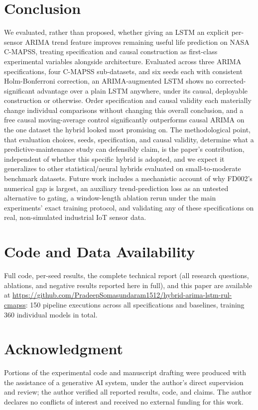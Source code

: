 \documentclass[conference]{IEEEtran}
\newif\ifblind
\begin{document}
\section{Conclusion}
We evaluated, rather than proposed, whether giving an LSTM an explicit per-sensor ARIMA trend feature improves remaining useful life prediction on NASA C-MAPSS, treating specification and causal construction as first-class experimental variables alongside architecture. Evaluated across three ARIMA specifications, four C-MAPSS sub-datasets, and six seeds each with consistent Holm-Bonferroni correction, an ARIMA-augmented LSTM shows no corrected-significant advantage over a plain LSTM anywhere, under its causal, deployable construction or otherwise. Order specification and causal validity each materially change individual comparisons without changing this overall conclusion, and a free causal moving-average control significantly outperforms causal ARIMA on the one dataset the hybrid looked most promising on. The methodological point, that evaluation choices, seeds, specification, and causal validity, determine what a predictive-maintenance study can defensibly claim, is the paper's contribution, independent of whether this specific hybrid is adopted, and we expect it generalizes to other statistical/neural hybrids evaluated on small-to-moderate benchmark datasets. Future work includes a mechanistic account of why FD002's numerical gap is largest, an auxiliary trend-prediction loss as an untested alternative to gating, a window-length ablation rerun under the main experiments' exact training protocol, and validating any of these specifications on real, non-simulated industrial IoT sensor data.

\section*{Code and Data Availability}
Full code, per-seed results, the complete technical report (all research questions, ablations, and negative results reported here in full), and this paper are available at \ifblind [repository URL withheld for blind review]\else \url{https://github.com/PradeepSomasundaram1512/hybrid-arima-lstm-rul-cmapss}\fi: 150 pipeline executions across all specifications and baselines, training 360 individual models in total.

\section*{Acknowledgment}
Portions of the experimental code and manuscript drafting were produced with the assistance of a generative AI system, under the author's direct supervision and review; the author verified all reported results, code, and claims. The author declares no conflicts of interest and received no external funding for this work.
\end{document}
